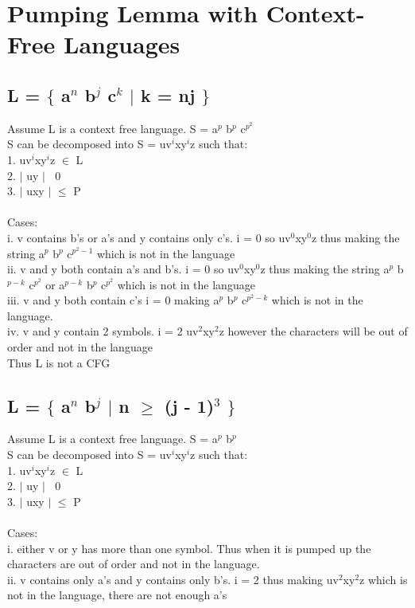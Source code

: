\documentclass[10pt,a4paper]{article}
\begin{document}
\section{Pumping Lemma with Context-Free Languages}
\subsection{L = $\lbrace$ a$^{n}$ b$^{j}$ c$^{k}$ $\mid$ k = nj $\rbrace$}
	Assume L is a context free language. S = a$^{p}$ b$^{p}$ c$^{p^{2}}$\\
	S can be decomposed into S = uv$^{i}$xy$^{i}$z such that:\\
	1. uv$^{i}$xy$^{i}$z $\in$ L\\
	2. $\mid$ uy $\mid$ $\>$ 0 \\
	3. $\mid$ uxy $\mid$ $\leq$ P\\
	\\
	Cases:\\
	i. v contains b's or a's and y contains only c's. i = 0 so uv$^{0}$xy$^{0}$z 	thus making the string a$^{p}$ b$^{p}$ c$^{p^{2}-1}$ which is not in the language\\
	ii. v and y both contain a's and b's. i = 0 so uv$^{0}$xy$^{0}$z thus making the string a$^{p}$ b$^{p-k}$ c$^{p^{2}}$ or  a$^{p-k}$ b$^{p}$ c$^{p^{2}}$ which is not in the 		language\\ 
	iii. v and y both contain c's i = 0 making a$^{p}$ b$^{p}$ c$^{p^{2}-k}$ which is not in the language.\\
	iv. v and y contain 2 symbols. i = 2 uv$^{2}$xy$^{2}$z however the characters will be out of order and not in the language\\
	Thus L is not a CFG

\subsection{L = $\lbrace$ a$^{n}$ b$^{j}$ $\mid$ n $\geq$ (j - 1)$^{3}$ $\rbrace$}


	Assume L is a context free language. S = a$^{p}$ b$^{p}$\\
	S can be decomposed into S = uv$^{i}$xy$^{i}$z such that:\\
	1. uv$^{i}$xy$^{i}$z $\in$ L\\
	2. $\mid$ uy $\mid$ $\>$ 0 \\
	3. $\mid$ uxy $\mid$ $\leq$ P\\
	\\
	Cases:\\
	i. either v or y has more than one symbol. Thus when it is pumped up the characters are out of order and not in the language.\\
	ii. v contains only a's and y contains only b's. i = 2 thus making uv$^{2}$xy$^{2}$z which is not in the language, there are not enough a's
\end{document}
